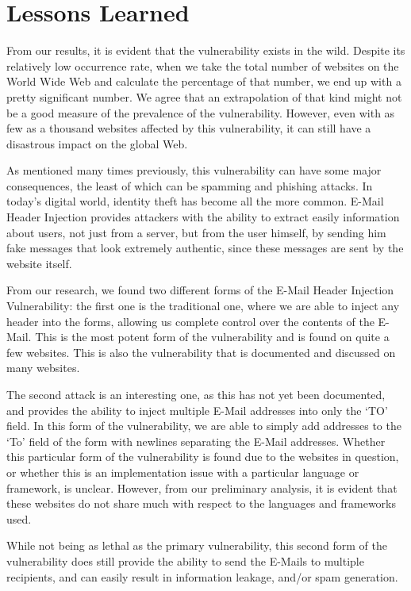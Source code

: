 \section{Lessons Learned}
    From our results, it is evident that the vulnerability exists in the wild. Despite its relatively low occurrence rate, when we take the total number of websites on the World Wide Web and calculate the percentage of that number, we end up with a pretty significant number. We agree that an extrapolation of that kind might not be a good measure of the prevalence of the vulnerability. However, even with as few as a thousand websites affected by this vulnerability, it can still have a disastrous impact on the global Web. 
    
    As mentioned many times previously, this vulnerability can have some major consequences, the least of which can be spamming and phishing attacks. In today's digital world, identity theft has become all the more common. E-Mail Header Injection provides attackers with the ability to extract easily information about users, not just from a server, but from the user himself, by sending him fake messages that look extremely authentic, since these messages are sent by the website itself.
    
    From our research, we found two different forms of the E-Mail Header Injection Vulnerability: the first one is the traditional one, where we are able to inject any header into the forms, allowing us complete control over the contents of the E-Mail. This is the most potent form of the vulnerability and is found on quite a few websites. This is also the vulnerability that is documented and discussed on many websites.
    
    The second attack is an interesting one, as this has not yet been documented, and provides the ability to inject multiple E-Mail addresses into only the `TO' field. In this form of the vulnerability, we are able to simply add addresses to the `To' field of the form with newlines separating the E-Mail addresses. Whether this particular form of the vulnerability is found due to the websites in question, or whether this is an implementation issue with a particular language or framework, is unclear. However, from our preliminary analysis, it is evident that these websites do not share much with respect to the languages and frameworks used. 
    
    While not being as lethal as the primary vulnerability, this second form of the vulnerability does still provide the ability to send the E-Mails to multiple recipients, and can easily result in information leakage, and/or spam generation.
    
